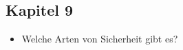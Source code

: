 \documentclass[10pt,a4paper]{article}
\begin{document}
\subsection*{Kapitel 9}

\begin{itemize}
\item Welche Arten von Sicherheit gibt es?
\end{itemize}
\end{document}
